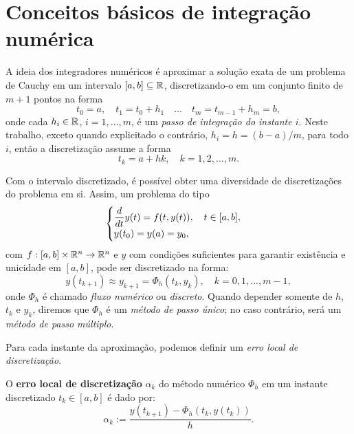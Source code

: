 \section{Conceitos básicos de integração numérica}

A ideia dos integradores numéricos é aproximar a solução exata de um problema de Cauchy em um intervalo $[a,b] \subseteq \mathbb{R}$, discretizando-o em um conjunto finito de $m+1$ pontos na forma
\begin{equation*}
    t_0 = a, \quad
    t_1 = t_0 + h_1 \quad
    \hdots \quad
    t_m = t_{m-1} + h_m = b,
\end{equation*}
onde cada $h_i \in \mathbb{R}$, $i = 1, ..., m$, é um \textit{passo de integração do instante $i$}. Neste trabalho, exceto quando explicitado o contrário, $h_i = h = (b-a)/m$, para todo $i$, então a discretização assume a forma
\begin{equation*}
    t_k = a + hk, \quad k = 1, 2, ..., m.
\end{equation*}

Com o intervalo discretizado, é possível obter uma diversidade de discretizações do problema em si. Assim, um problema do tipo
\begin{equation}\label{eq:problema_de_cauchy}
    \begin{cases}
        \dfrac{d }{d t} y(t) = f(t,y(t)), \quad t \in [a,b], \\
        y(t_0) = y(a) = y_0,
    \end{cases}
\end{equation}
com $f:[a,b] \times \mathbb{R}^n \to \mathbb{R}^n$ e $y$ com condições suficientes para garantir existência e unicidade em $[a,b]$, pode ser discretizado na forma:
\begin{equation*}
    y(t_{k+1}) \approx y_{k+1} = \Phi_h(t_k, y_k), \quad k = 0, 1, ..., m-1,
\end{equation*}
onde $\Phi_h$ é chamado \textit{fluxo numérico} ou \textit{discreto}. Quando depender somente de $h$, $t_k$ e $y_k$, diremos que $\Phi_h$ é um \textit{método de passo único}; no caso contrário, será um \textit{método de passo múltiplo}.

Para cada instante da aproximação, podemos definir um \textit{erro local de discretização}.

\begin{definition}\label{def:erro_local_discretizacao}
    O \textbf{erro local de discretização} $\alpha_k$ do método numérico $\Phi_h$ em um instante discretizado $t_k \in [a,b]$ é dado por:
    \begin{equation*}
        \alpha_k := \dfrac{y(t_{k+1}) - \Phi_h(t_k, y(t_k))}{h}.
    \end{equation*}
\end{definition}

